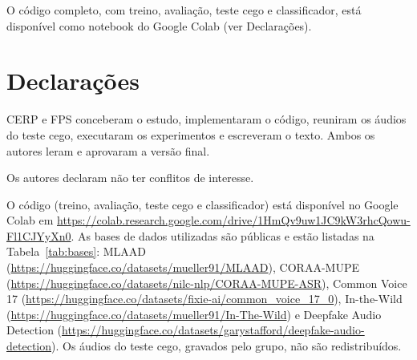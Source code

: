 O código completo, com treino, avaliação, teste cego e classificador, está disponível como notebook do Google Colab (ver Declarações).


\section*{Declarações}

\begin{contributions}
CERP e FPS conceberam o estudo, implementaram o código, reuniram os áudios do teste cego, executaram os experimentos e escreveram o texto. Ambos os autores leram e aprovaram a versão final.
\end{contributions}

\begin{interests}
Os autores declaram não ter conflitos de interesse.
\end{interests}

\begin{materials}
O código (treino, avaliação, teste cego e classificador) está disponível no Google Colab em \url{https://colab.research.google.com/drive/1HmQv9uw1JC9kW3rhcQowu-Fl1CJYyXn0}. As bases de dados utilizadas são públicas e estão listadas na Tabela~\ref{tab:bases}: MLAAD (\url{https://huggingface.co/datasets/mueller91/MLAAD}), CORAA-MUPE (\url{https://huggingface.co/datasets/nilc-nlp/CORAA-MUPE-ASR}), Common Voice 17 (\url{https://huggingface.co/datasets/fixie-ai/common_voice_17_0}), In-the-Wild (\url{https://huggingface.co/datasets/mueller91/In-The-Wild}) e Deepfake Audio Detection (\url{https://huggingface.co/datasets/garystafford/deepfake-audio-detection}). Os áudios do teste cego, gravados pelo grupo, não são redistribuídos.
\end{materials}






